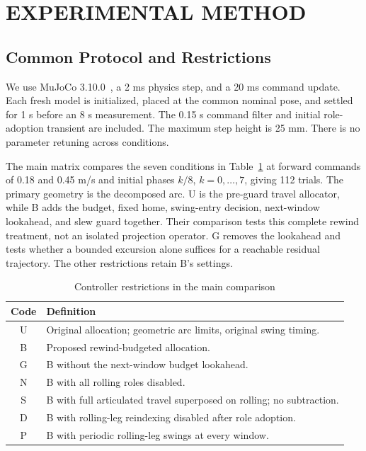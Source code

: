 \documentclass[letterpaper,10pt,conference]{ieeeconf}
\begin{document}
\section{EXPERIMENTAL METHOD}
\subsection{Common Protocol and Restrictions}
We use MuJoCo 3.10.0~\cite{todorov2012mujoco}, a 2 ms physics step, and a 20 ms command update. Each fresh model is initialized, placed at the common nominal pose, and settled for 1 s before an 8 s measurement. The 0.15 s command filter and initial role-adoption transient are included. The maximum step height is 25 mm. There is no parameter retuning across conditions.

The main matrix compares the seven conditions in Table~\ref{tab:conditions} at forward commands of 0.18 and 0.45 m/s and initial phases $k/8$, $k=0,\ldots,7$, giving 112 trials. The primary geometry is the decomposed arc. U is the pre-guard travel allocator, while B adds the budget, fixed home, swing-entry decision, next-window lookahead, and slew guard together. Their comparison tests this complete rewind treatment, not an isolated projection operator. G removes the lookahead and tests whether a bounded excursion alone suffices for a reachable residual trajectory. The other restrictions retain B's settings.

\begin{table}[t]
\caption{Controller restrictions in the main comparison}
\label{tab:conditions}\centering\small
\begin{tabular}{cp{6.7cm}}\toprule
Code & Definition\\\midrule
U & Original allocation; geometric arc limits, original swing timing.\\
B & Proposed rewind-budgeted allocation.\\
G & B without the next-window budget lookahead.\\
N & B with all rolling roles disabled.\\
S & B with full articulated travel superposed on rolling; no subtraction.\\
D & B with rolling-leg reindexing disabled after role adoption.\\
P & B with periodic rolling-leg swings at every window.\\\bottomrule
\end{tabular}
\end{table}
\end{document}
